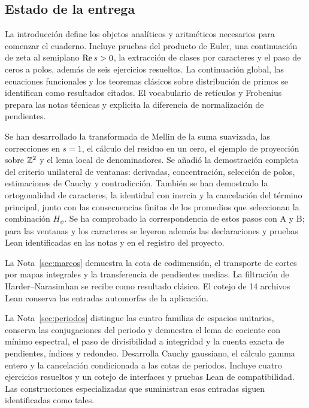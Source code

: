 \begingroup
\setlength{\parskip}{0.40em}
\linespread{0.97}\selectfont
\subsection*{Estado de la entrega}

La introducción define los objetos analíticos y aritméticos necesarios
para comenzar el cuaderno. Incluye pruebas del producto de Euler, una
continuación de zeta al semiplano $\operatorname{Re} s>0$, la extracción de clases
por caracteres y el paso de ceros a polos, además de seis ejercicios
resueltos. La continuación global, las ecuaciones funcionales y los
teoremas clásicos sobre distribución de primos se identifican como
resultados citados. El vocabulario de retículos y Frobenius prepara las
notas técnicas y explicita la diferencia de normalización de pendientes.

Se han desarrollado la transformada de Mellin de la suma suavizada,
las correcciones en $s=1$, el cálculo del residuo en un cero, el ejemplo
de proyección sobre $\mathbb{Z}^2$ y el lema local de denominadores. Se añadió
la demostración completa del criterio unilateral de ventanas: derivadas,
concentración, selección de polos, estimaciones de Cauchy y contradicción.
También se han demostrado la ortogonalidad de caracteres, la identidad
con inercia y la cancelación del término principal, junto con las
consecuencias finitas de los promedios que seleccionan la combinación
$H_\psi$. Se ha comprobado la correspondencia de estos pasos con A y B;
para las ventanas y los caracteres se leyeron además las declaraciones y
pruebas Lean identificadas en las notas y en el registro del proyecto.

La Nota~\ref{sec:marcos} demuestra la cota de codimensión, el transporte
de cortes por mapas integrales y la transferencia de pendientes medias.
La filtración de Harder--Narasimhan se recibe como resultado clásico.
El cotejo de 14 archivos Lean conserva las entradas automorfas de la aplicación.

La Nota~\ref{sec:periodos} distingue las cuatro familias de espacios
unitarios, conserva las conjugaciones del periodo y demuestra el lema
de cociente con mínimo espectral, el paso de divisibilidad a integridad
y la cuenta exacta de pendientes, índices y redondeo. Desarrolla
Cauchy gaussiano, el cálculo gamma entero y la cancelación condicionada
a las cotas de periodos. Incluye cuatro ejercicios resueltos y un
cotejo de interfaces y pruebas Lean de compatibilidad. Las construcciones
especializadas que suministran esas entradas siguen identificadas como tales.


